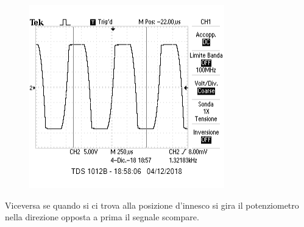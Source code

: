 \documentclass{article}
\begin{document}
\begin{figure}[htb]
\begin{minipage}[t]{.5\linewidth}
			\includegraphics[width=\linewidth]{figure/clipping2.png}
			\label{fig:clipping2}
	    \end{minipage}
	\end{figure}
	Viceversa se quando si ci trova alla posizione d'innesco si gira il potenziometro nella direzione opposta a prima il segnale scompare.
\end{document}
